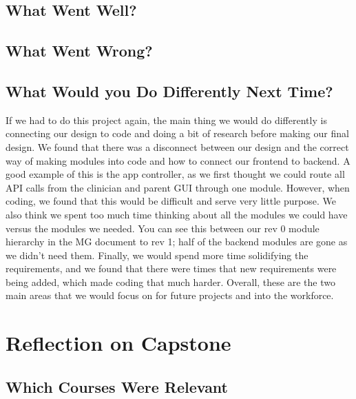 \documentclass{article}
\begin{document}
\subsection{What Went Well?}




\subsection{What Went Wrong?}


\subsection{What Would you Do Differently Next Time?}

If we had to do this project again, the main thing we would do differently is connecting our design to code and doing a bit of research before making our final design. 
We found that there was a disconnect between our design and the correct way of making modules into code and how to connect our frontend to backend. A good example of this is 
the app controller, as we first thought we could route all API calls from the clinician and parent GUI through one module. However, when coding, we found that this would be 
difficult and serve very little purpose. We also think we spent too much time thinking about all the modules we could have versus the modules we needed. You can see this between our
rev 0 module hierarchy in the MG document to rev 1; half of the backend modules are gone as we didn't need them. Finally, we would spend more time solidifying the requirements, and we found that 
there were times that new requirements were being added, which made coding that much harder. Overall, these are the two main areas that we would focus on for future projects and into the workforce.

\newpage

\section{Reflection on Capstone}


\subsection{Which Courses Were Relevant}
\end{document}
